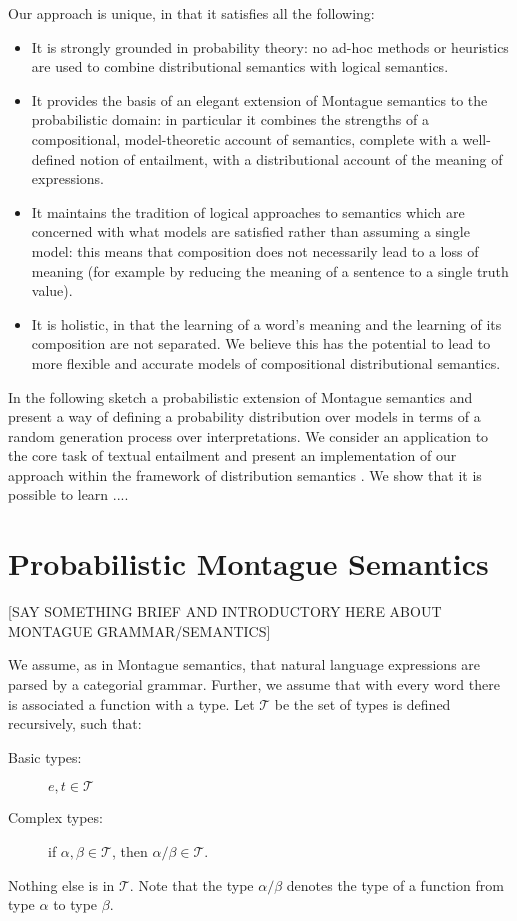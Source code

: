 \documentclass[letterpaper]{article}
\begin{document}
Our approach is unique, in that it satisfies all the following:
\begin{itemize}
\item It is strongly grounded in probability theory: no ad-hoc methods
  or heuristics are used to combine distributional semantics with
  logical semantics.
\item It provides the basis of an elegant extension of Montague semantics to the
  probabilistic domain: in particular it combines the strengths of a compositional, model-theoretic account of semantics, complete with a well-defined notion of entailment, with a distributional account of the meaning of expressions.
\item It maintains the tradition of logical approaches to semantics
  which are concerned with what models are satisfied rather than
  assuming a single model: this means that composition does not
  necessarily lead to a loss of meaning (for example by reducing the meaning of a
  sentence to a single truth value).
  \item It is holistic, in that the learning of a word's meaning and the
  learning of its composition are not separated. We believe this has
  the potential to lead to more flexible and accurate models of
  compositional distributional semantics.
\end{itemize}

In the following sketch a probabilistic extension of Montague semantics and present a way of defining a probability distribution over models in terms of  a random generation process over interpretations.  We consider an application to the core task of textual entailment and present an implementation of our approach within the framework of distribution semantics \cite{ref}. We show that it is possible to learn ....

\section{Probabilistic Montague Semantics}

[SAY SOMETHING BRIEF AND INTRODUCTORY HERE ABOUT MONTAGUE GRAMMAR/SEMANTICS]

We assume, as in Montague semantics, that natural language expressions
are parsed by a categorial grammar. Further, we assume that with every word there is
associated a function with a type. Let $\mathcal{T}$ be the set of types is defined
recursively, such that:
\begin{description}
\item [Basic types:] $e,t\in \mathcal{T}$
\item[Complex types:]  if $\alpha, \beta\in \mathcal{T}$, then $\alpha/\beta\in \mathcal{T}$.
\end{description}
Nothing else is in $\mathcal{T}$. Note that the type $\alpha/\beta$ denotes the type of a function from type
$\alpha$ to type $\beta$.
\end{document}

